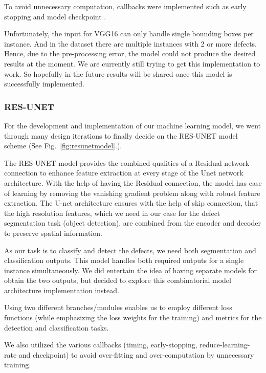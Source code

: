 \documentclass[12pt]{article}
\begin{document}
To avoid unnecessary computation, callbacks were implemented such as early stopping and model checkpoint \cite{TensorFlowAPI}. 

Unfortunately, the input for VGG16 can only handle single bounding boxes per instance. And in the dataset there are multiple instances with 2 or more defects. Hence, due to the pre-processing error, the model could not produce the desired results at the moment. We are currently still trying to get this implementation to work. So hopefully in the future results will be shared once this model is successfully implemented. 

\clearpage
\newpage

\subsubsection{RES-UNET}
For the development and implementation of our machine learning model, we went through many design iterations to finally decide on the RES-UNET model scheme (See Fig.~\ref{fig:resunetmodel}.).

The RES-UNET model provides the combined qualities of a Residual network connection to enhance feature extraction at every stage of the Unet network architecture. With the help of having the Residual connection, the model has ease of learning by removing the vanishing gradient problem along with robust feature extraction. The U-net architecture ensures with the help of skip connection, that the high resolution features, which we need in our case for the defect segmentation task (object detection), are combined from the encoder and decoder to preserve spatial information.

As our task is to classify and detect the defects, we need both segmentation and classification outputs. This model handles both required outputs for a single instance simultaneously. We did entertain the idea of having separate models for obtain the two outputs, but decided to explore this combinatorial model architecture implementation instead.

Using two different branches/modules enables us to employ different loss functions (while emphasizing the loss weights for the training) and metrics for the detection and classification tasks.

We also utilized the various callbacks (timing, early-stopping, reduce-learning-rate and checkpoint) to avoid over-fitting and over-computation by unnecessary training. 
\end{document}
